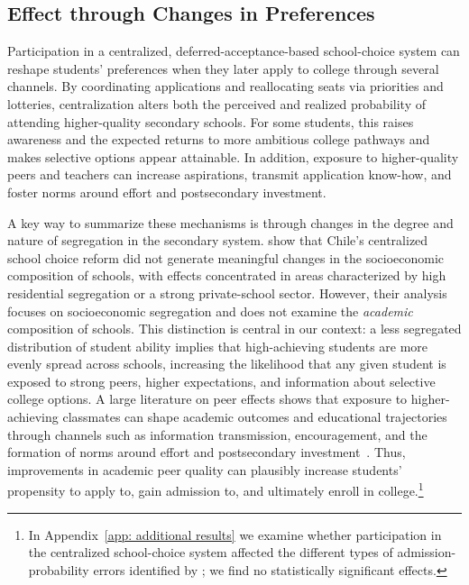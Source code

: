 \subsection{Effect through Changes in Preferences}
Participation in a centralized, deferred-acceptance-based school-choice system can reshape students' preferences when they later apply to college through several channels. By coordinating applications and reallocating seats via priorities and lotteries, centralization alters both the perceived and realized probability of attending higher-quality secondary schools. For some students, this raises awareness and the expected returns to more ambitious college pathways and makes selective options appear attainable. In addition, exposure to higher-quality peers and teachers can increase aspirations, transmit application know-how, and foster norms around effort and postsecondary investment.

A key way to summarize these mechanisms is through changes in the degree and nature of segregation in the secondary system. \citet{urzua2023} show that Chile's centralized school choice reform did not generate meaningful changes in the socioeconomic composition of schools, with effects concentrated in areas characterized by high residential segregation or a strong private-school sector. However, their analysis focuses on socioeconomic segregation and does not examine the \emph{academic} composition of schools. This distinction is central in our context: a less segregated distribution of student ability implies that high-achieving students are more evenly spread across schools, increasing the likelihood that any given student is exposed to strong peers, higher expectations, and information about selective college options.
A large literature on peer effects shows that exposure to higher-achieving classmates can shape academic outcomes and educational trajectories through channels such as information transmission, encouragement, and the formation of norms around effort and postsecondary investment~\citep{hoxby2000b, Sacerdote2001, CarrellSacerdoteWest2013}. Thus, improvements in academic peer quality can plausibly increase students’ propensity to apply to, gain admission to, and ultimately enroll in college.\footnote{In Appendix~\ref{app: additional results} we examine whether participation in the centralized school-choice system affected the different types of admission-probability errors identified by \cite{larroucau2024}; we find no statistically significant effects. }


